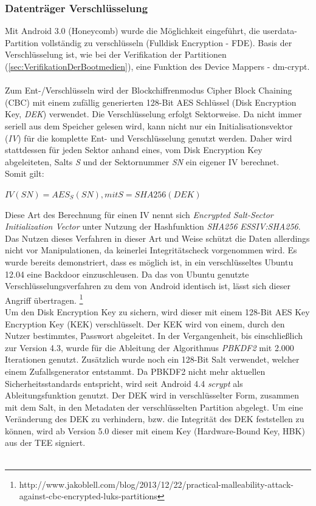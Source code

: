 	\subsubsection{Datenträger Verschlüsselung}
	Mit Android 3.0 (Honeycomb) wurde die Möglichkeit eingeführt, die userdata-Partition vollständig zu verschlüsseln (Fulldisk Encryption - FDE). Basis der Verschlüsselung ist, wie bei der Verifikation der Partitionen (\ref{sec:VerifikationDerBootmedien}), eine Funktion des Device Mappers - dm-crypt.\\\\
	Zum Ent-/Verschlüsseln wird der Blockchiffrenmodus Cipher Block Chaining (CBC) mit einem zufällig generierten 128-Bit AES Schlüssel (Disk Encryption Key, \textit{DEK}) verwendet. Die Verschlüsselung erfolgt Sektorweise. Da nicht immer seriell aus dem Speicher gelesen wird, kann nicht nur ein Initialisationsvektor (\textit{IV}) für die komplette Ent- und Verschlüsselung genutzt werden. Daher wird stattdessen für jeden Sektor anhand eines, vom Disk Encryption Key abgeleiteten, Salts \textit{S} und der Sektornummer \textit{SN} ein eigener IV berechnet.\\
	Somit gilt:\\
\begin{center}
	\begin{math}
	IV(SN) = AES_{S}(SN), mit S = SHA256(DEK)
	\end{math}
\end{center}
	Diese Art des Berechnung für einen IV nennt sich \textit{Encrypted Salt-Sector Initialization Vector} unter Nutzung der Hashfunktion \textit{SHA256} \textit{ESSIV:SHA256}.\cite[S. 259]{Elenkov2014} Das Nutzen dieses Verfahren in dieser Art und Weise schützt die Daten allerdings nicht vor Manipulationen, da keinerlei Integritätscheck vorgenommen wird. Es wurde bereits demonstriert, dass es möglich ist, in ein verschlüsseltes Ubuntu 12.04 eine Backdoor einzuschleusen. Da das von Ubuntu genutzte Verschlüsselungsverfahren zu dem von Android identisch ist, lässt sich dieser Angriff übertragen. \footnote{http://www.jakoblell.com/blog/2013/12/22/practical-malleability-attack-against-cbc-encrypted-luks-partitions}\\
	Um den Disk Encryption Key zu sichern, wird dieser mit einem 128-Bit AES Key Encryption Key (KEK) verschlüsselt. Der KEK wird von einem, durch den Nutzer bestimmtes, Passwort abgeleitet. In der Vergangenheit, bis einschließlich zur Version 4.3, wurde für die Ableitung der Algorithmus \textit{PBKDF2} mit 2.000 Iterationen genutzt. Zusätzlich wurde noch ein 128-Bit Salt verwendet, welcher einem Zufallsgenerator entstammt. Da PBKDF2 nicht mehr aktuellen Sicherheitsstandards entspricht, wird seit Android 4.4 \textit{scrypt} als Ableitungsfunktion genutzt. Der DEK wird in verschlüsselter Form, zusammen mit dem Salt, in den Metadaten der verschlüsselten Partition abgelegt. Um eine Veränderung des DEK zu verhindern, bzw. die Integrität des DEK feststellen zu können, wird ab Version 5.0 dieser mit einem Key (Hardware-Bound Key, HBK) aus der TEE signiert. \\\\
